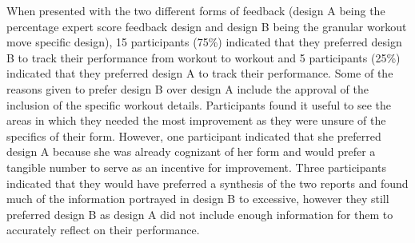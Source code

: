 When presented with the two different forms of feedback (design A being the percentage expert score feedback design and design B being the granular workout move specific design),  15 participants (75\%) indicated that they preferred design B to track their performance from workout to workout and 5 participants (25\%) indicated that they preferred design A to track their performance. Some of the reasons given to prefer design B over design A include the approval of the inclusion of the specific workout details.  Participants found it useful to see the areas in which they needed the most improvement as they were unsure of the specifics of their form.  However, one participant indicated that she preferred design A because she was already cognizant of her form and would prefer a tangible number to serve as an incentive for improvement.  Three participants indicated that they would have preferred a synthesis of the two reports and found much of the information portrayed in design B to excessive, however they still preferred design B as design A did not include enough information for them to accurately reflect on their performance.

